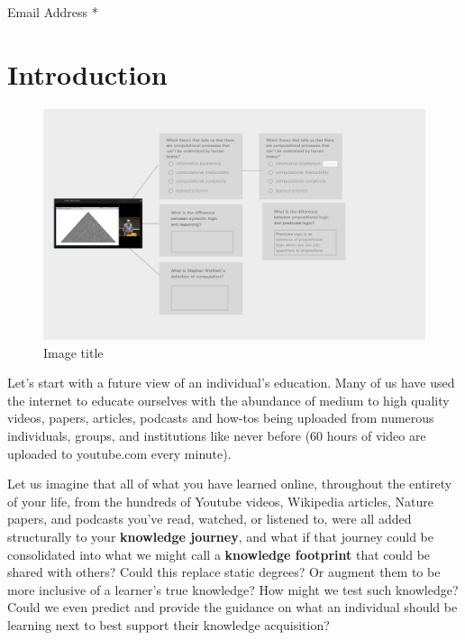 \documentclass[]{book}
\theoremstyle{definition}
\theoremstyle{definition}
\theoremstyle{definition}
\theoremstyle{remark}
\begin{document}
Email Address *

\hypertarget{mce-responses}{}
\hypertarget{mce-error-response}{}

\hypertarget{mce-success-response}{}

\chapter{Introduction}\label{introduction}

\begin{figure}
\centering
\includegraphics{img/MtoQA.png}
\caption{Image title}
\end{figure}

Let's start with a future view of an individual's education. Many of us
have used the internet to educate ourselves with the abundance of medium
to high quality videos, papers, articles, podcasts and how-tos being
uploaded from numerous individuals, groups, and institutions like never
before (60 hours of video are uploaded to youtube.com every minute).

Let us imagine that all of what you have learned online, throughout the
entirety of your life, from the hundreds of Youtube videos, Wikipedia
articles, Nature papers, and podcasts you've read, watched, or listened
to, were all added structurally to your \textbf{knowledge journey}, and
what if that journey could be consolidated into what we might call a
\textbf{knowledge footprint} that could be shared with others? Could
this replace static degrees? Or augment them to be more inclusive of a
learner's true knowledge? How might we test such knowledge? Could we
even predict and provide the guidance on what an individual should be
learning next to best support their knowledge acquisition?
\end{document}
